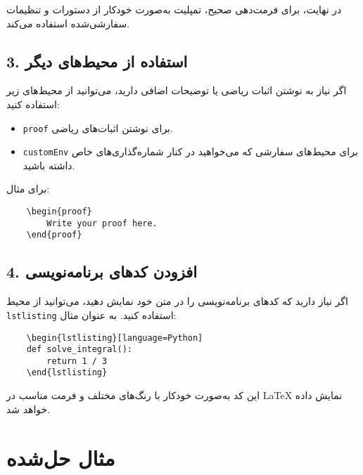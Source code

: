 در نهایت، برای فرمت‌دهی صحیح، تمپلیت به‌صورت خودکار از دستورات و تنظیمات سفارشی‌شده استفاده می‌کند.

\subsection*{3. استفاده از محیط‌های دیگر}

اگر نیاز به نوشتن اثبات ریاضی یا توضیحات اضافی دارید، می‌توانید از محیط‌های زیر استفاده کنید:

\begin{itemize}
    \item \texttt{proof} برای نوشتن اثبات‌های ریاضی.
    \item \texttt{customEnv} برای محیط‌های سفارشی که می‌خواهید در کنار شماره‌گذاری‌های خاص داشته باشید.
\end{itemize}

برای مثال:

\begin{LTR}
    \begin{verbatim}
    \begin{proof}
        Write your proof here.
    \end{proof}
    \end{verbatim}
\end{LTR}

\subsection*{4. افزودن کدهای برنامه‌نویسی}

اگر نیاز دارید که کدهای برنامه‌نویسی را در متن خود نمایش دهید، می‌توانید از محیط \texttt{lstlisting} استفاده کنید. به عنوان مثال:

\begin{LTR}
    \begin{verbatim}
    \begin{lstlisting}[language=Python]
    def solve_integral():
        return 1 / 3
    \end{lstlisting}
    \end{verbatim}
\end{LTR}


این کد به‌صورت خودکار با رنگ‌های مختلف و فرمت مناسب در LaTeX نمایش داده خواهد شد.

\section*{مثال حل‌شده}

